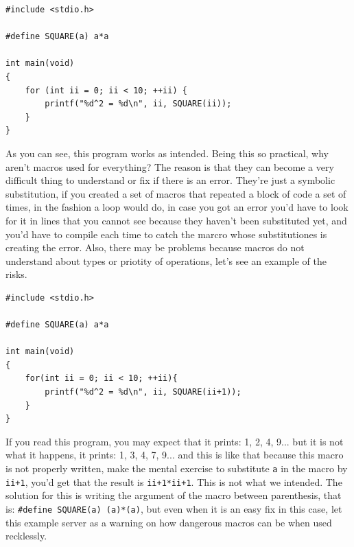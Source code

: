 \documentclass[a4paper]{article}
\begin{document}
\noindent
\begin{minipage}[H]{\linewidth}
\mbox{}
\begin{lstlisting}[style=C,
caption={Macro with arguments},
label={lst:macroWithArguments}]
#include <stdio.h>

#define SQUARE(a) a*a

int main(void)
{
    for (int ii = 0; ii < 10; ++ii) {
        printf("%d^2 = %d\n", ii, SQUARE(ii));
    }
}
\end{lstlisting}
\end{minipage}

As you can see, this program works as intended. Being this so practical, why
aren't macros used for everything? The reason is that they can become a very
difficult thing to understand or fix if there is an error. They're just a
symbolic substitution, if you created a set of macros that repeated a block of
code a set of times, in the fashion a loop would do, in case you got an error
you'd have to look for it in lines that you cannot see because they haven't been
substituted yet, and you'd have to compile each time to catch the marcro whose
substitutiones is creating the error. Also, there may be problems because macros
do not understand about types or priotity of operations, let's see an example of
the risks.

\noindent
\begin{minipage}[H]{\linewidth}
\mbox{}
\begin{lstlisting}[style=C,
caption={Example of error because of a macro},
label={lst:macroError}]
#include <stdio.h>

#define SQUARE(a) a*a

int main(void)
{
    for(int ii = 0; ii < 10; ++ii){
        printf("%d^2 = %d\n", ii, SQUARE(ii+1));
    }
}
\end{lstlisting}
\end{minipage}

If you read this program, you may expect that it prints: 1, 2, 4, 9... but
it is not what it happens, it prints: 1, 3, 4, 7, 9... and this is like that
because this macro is not properly written, make the mental exercise to
substitute \verb!a! in the macro by \verb!ii+1!, you'd get that the result is
\verb!ii+1*ii+1!. This is not what we intended. The solution for this is writing
the argument of the macro between parenthesis, that is:
\verb!#define SQUARE(a) (a)*(a)!, but even when it is an easy fix in this case,
let this example server as a warning on how dangerous macros can be when used
recklessly.
\end{document}
